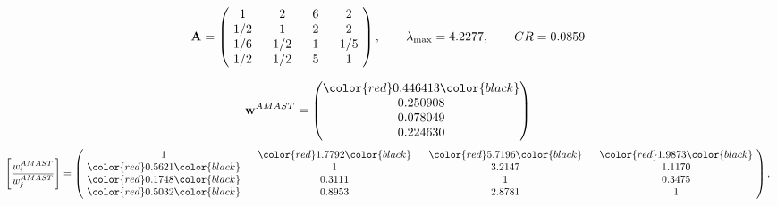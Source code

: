 \begin{example}
\begin{equation*}
\mathbf{A} =
\begin{pmatrix}
$\,\,$ 1 $\,\,$ & $\,\,$2$\,\,$ & $\,\,$6$\,\,$ & $\,\,$2 $\,\,$ \\
$\,\,$ 1/2$\,\,$ & $\,\,$ 1 $\,\,$ & $\,\,$2$\,\,$ & $\,\,$2 $\,\,$ \\
$\,\,$ 1/6$\,\,$ & $\,\,$ 1/2$\,\,$ & $\,\,$ 1 $\,\,$ & $\,\,$ 1/5 $\,\,$ \\
$\,\,$ 1/2$\,\,$ & $\,\,$ 1/2$\,\,$ & $\,\,$5$\,\,$ & $\,\,$ 1  $\,\,$ \\
\end{pmatrix},
\qquad
\lambda_{\max} =
4.2277,
\qquad
CR = 0.0859
\end{equation*}

\begin{equation*}
\mathbf{w}^{AMAST} =
\begin{pmatrix}
\color{red} 0.446413\color{black} \\
0.250908\\
0.078049\\
0.224630
\end{pmatrix}\end{equation*}
\begin{equation*}
\left[ \frac{{w}^{AMAST}_i}{{w}^{AMAST}_j} \right] =
\begin{pmatrix}
$\,\,$ 1 $\,\,$ & $\,\,$\color{red} 1.7792\color{black} $\,\,$ & $\,\,$\color{red} 5.7196\color{black} $\,\,$ & $\,\,$\color{red} 1.9873\color{black} $\,\,$ \\
$\,\,$\color{red} 0.5621\color{black} $\,\,$ & $\,\,$ 1 $\,\,$ & $\,\,$3.2147$\,\,$ & $\,\,$1.1170  $\,\,$ \\
$\,\,$\color{red} 0.1748\color{black} $\,\,$ & $\,\,$0.3111$\,\,$ & $\,\,$ 1 $\,\,$ & $\,\,$0.3475 $\,\,$ \\
$\,\,$\color{red} 0.5032\color{black} $\,\,$ & $\,\,$0.8953$\,\,$ & $\,\,$2.8781$\,\,$ & $\,\,$ 1  $\,\,$ \\
\end{pmatrix},
\end{equation*}


\end{example}
